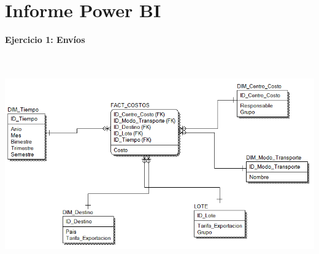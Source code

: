 \section{Informe Power BI} 
\begin{flushleft}


\begin{itemize}
\textbf{Ejercicio 1: Envíos}\\
\textbf{ }\\
\textbf{ }\\
\begin{center}
	\includegraphics[width=15cm]{./Imagenes/image1} 
	\end{center}
\textbf{ }\\
\textbf{ }\\
\textbf{ }\\
\textbf{ }\\
\textbf{ }\\
\textbf{ }\\
\textbf{ }\\
\textbf{ }\\
\textbf{ }\\
\textbf{ }\\
\textbf{ }\\
\textbf{ }\\
\textbf{ }\\
\textbf{ }\\
\textbf{ }\\
\textbf{ }\\
\textbf{ }\\


\end{itemize}
\end{flushleft}
